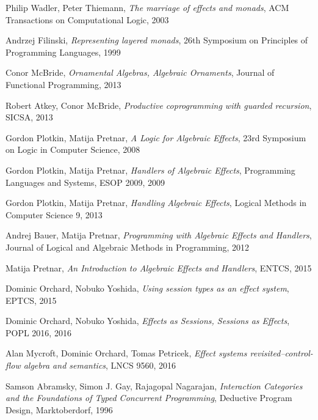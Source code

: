 \documentclass{article}
\begin{document}
\begin{thebibliography}{99}
    Philip Wadler, Peter Thiemann,
    \emph{The marriage of effects and monads},
    ACM Transactions on Computational Logic,
    2003

    Andrzej Filinski,
    \emph{Representing layered monads},
    26th Symposium on Principles of Programming Languages,
    1999

    Conor McBride,
    \emph{Ornamental Algebras, Algebraic Ornaments},
    Journal of Functional Programming,
    2013

    Robert Atkey, Conor McBride,
    \emph{Productive coprogramming with guarded recursion},
    SICSA,
    2013

    Gordon Plotkin, Matija Pretnar,
    \emph{A Logic for Algebraic Effects},
    23rd Symposium on Logic in Computer Science,
    2008

    Gordon Plotkin, Matija Pretnar,
    \emph{Handlers of Algebraic Effects},
    Programming Languages and Systems, ESOP 2009,
    2009

    Gordon Plotkin, Matija Pretnar,
    \emph{Handling Algebraic Effects},
    Logical Methods in Computer Science 9,
    2013

    Andrej Bauer, Matija Pretnar,
    \emph{Programming with Algebraic Effects and Handlers},
    Journal of Logical and Algebraic Methods in Programming,
    2012

    Matija Pretnar,
    \emph{An Introduction to Algebraic Effects and Handlers},
    ENTCS,
    2015

    Dominic Orchard, Nobuko Yoshida,
    \emph{Using session types as an effect system},
    EPTCS,
    2015

    Dominic Orchard, Nobuko Yoshida,
    \emph{Effects as Sessions, Sessions as Effects},
    POPL 2016,
    2016

    Alan Mycroft, Dominic Orchard, Tomas Petricek,
    \emph{Effect systems revisited--control-flow algebra and semantics},
    LNCS 9560,
    2016

    Samson Abramsky, Simon J. Gay, Rajagopal Nagarajan,
    \emph{Interaction Categories and the Foundations of Typed
      Concurrent Programming},
    Deductive Program Design, Marktoberdorf,
    1996


\end{thebibliography}
\end{document}
